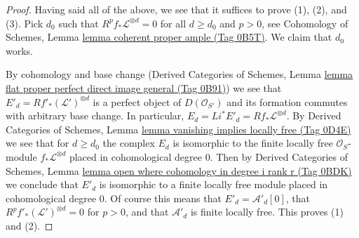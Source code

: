 \documentclass{amsart}
\theoremstyle{plain}
\theoremstyle{definition}
\theoremstyle{remark}
\numberwithin{equation}{subsection}
\begin{document}
\begin{proof}
\medskip\noindent
Having said all of the above, we see that it suffices to prove
(1), (2), and (3). Pick $d_0$ such that
$R^pf_*\mathcal{L}^{\otimes d} = 0$ for all $d \geq d_0$ and $p > 0$, see
Cohomology of Schemes, Lemma \href{https://stacks.math.columbia.edu/tag/0B5T}{lemma coherent proper ample (Tag 0B5T)}.
We claim that $d_0$ works.

\medskip\noindent
By cohomology and base change
(Derived Categories of Schemes,
Lemma \href{https://stacks.math.columbia.edu/tag/0B91}{lemma flat proper perfect direct image general (Tag 0B91)})
we see that $E'_d = Rf'_*(\mathcal{L}')^{\otimes d}$
is a perfect object of $D(\mathcal{O}_{S'})$
and its formation commutes with arbitrary base change.
In particular, $E_d = Li^*E'_d = Rf_*\mathcal{L}^{\otimes d}$.
By Derived Categories of Schemes, Lemma
\href{https://stacks.math.columbia.edu/tag/0D4E}{lemma vanishing implies locally free (Tag 0D4E)}
we see that for $d \geq d_0$ the complex $E_d$ is isomorphic to
the finite locally free $\mathcal{O}_S$-module
$f_*\mathcal{L}^{\otimes d}$ placed in
cohomological degree $0$. Then by
Derived Categories of Schemes, Lemma
\href{https://stacks.math.columbia.edu/tag/0BDK}{lemma open where cohomology in degree i rank r (Tag 0BDK)}
we conclude that $E'_d$ is isomorphic to a finite locally free
module placed in cohomological degree $0$.
Of course this means that $E'_d = \mathcal{A}'_d[0]$,
that $R^pf'_*(\mathcal{L}')^{\otimes d} = 0$ for $p > 0$,
and that $\mathcal{A}'_d$ is finite locally free.
This proves (1) and (2).


\end{proof}
\end{document}
